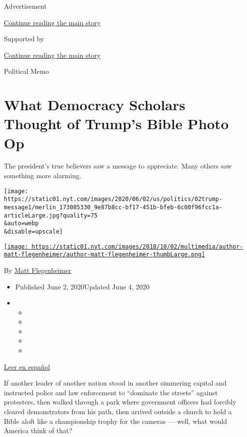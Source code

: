 Advertisement

\protect\hyperlink{after-top}{Continue reading the main story}

Supported by

\protect\hyperlink{after-sponsor}{Continue reading the main story}

Political Memo

\hypertarget{what-democracy-scholars-thought-of-trumps-bible-photo-op}{%
\section{What Democracy Scholars Thought of Trump's Bible Photo
Op}\label{what-democracy-scholars-thought-of-trumps-bible-photo-op}}

The president's true believers saw a message to appreciate. Many others
saw something more alarming.

\texttt{[image: https://static01.nyt.com/images/2020/06/02/us/politics/02trump-message1/merlin\_173085330\_9e87b8cc-bf17-451b-bfeb-6c00f96fcc1a-articleLarge.jpg?quality=75\\\&auto=webp\\\&disable=upscale]}

\href{https://www.nytimes.com/by/matt-flegenheimer}{\texttt{[image: https://static01.nyt.com/images/2018/10/02/multimedia/author-matt-flegenheimer/author-matt-flegenheimer-thumbLarge.png]}}

By \href{https://www.nytimes.com/by/matt-flegenheimer}{Matt
Flegenheimer}

\begin{itemize}
\item
  Published June 2, 2020Updated June 4, 2020
\item
  \begin{itemize}
  \item
  \item
  \item
  \item
  \item
  \end{itemize}
\end{itemize}

\href{https://www.nytimes.com/es/2020/06/04/espanol/mundo/trump-biblia.html}{Leer
en español}

If another leader of another nation stood in another simmering capital
and instructed police and law enforcement to ``dominate the streets''
against protesters, then walked through a park where government officers
had forcibly cleared demonstrators from his path, then arrived outside a
church to hold a Bible aloft like a championship trophy for the cameras
--- well, what would America think of that?

